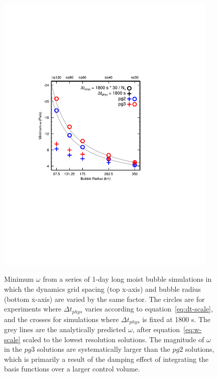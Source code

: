 \documentclass[draft,linenumbers]{agujournal}
\begin{document}
\begin{figure}[t]
\begin{center}
\noindent\includegraphics[width=25pc,angle=0]{bubble_test.pdf}\\
\end{center}
\caption{Minimum $\omega$ from a series of 1-day long moist bubble simulations in which the dynamics grid spacing (top x-axis) and bubble radius (bottom x-axis) are varied by the same factor. The circles are for experiments where $\Delta t_{phys}$ varies according to equation~\eqref{eq:dt-scale}, and the crosses for simulations where $\Delta t_{phys}$ is fixed at 1800 s. The grey lines are the analytically predicted $\omega$, after equation~\eqref{eq:w-scale} scaled to the lowest resolution solutions. The magnitude of $\omega$ in the $pg3$ solutions are systematically larger than the $pg2$ solutions, which is primarily a result of the damping effect of integrating the basis functions over a larger control volume.}
\label{fig:bubble}
\end{figure}
\end{document}

